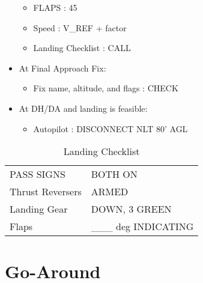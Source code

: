 \begin{itemize}
\begin{itemize}
\item FLAPS : 45

\item Speed : V\_REF + factor

\item Landing Checklist : CALL

\end{itemize}

\item At Final Approach Fix:

\begin{itemize}
\item Fix name, altitude, and flags : CHECK

\end{itemize}

\item At DH\slash DA and landing is feasible:

\begin{itemize}
\item Autopilot : DISCONNECT NLT 80' AGL

\end{itemize}

\end{itemize}

\begin{table}[htbp]
\begin{minipage}{\linewidth}
\setlength{\tymax}{0.5\linewidth}
\centering
\small
\caption{Landing Checklist}
\label{landingchecklist}
\begin{tabulary}{\textwidth}{@{}ll@{}} \toprule
\midrule

 PASS SIGNS  & BOTH ON   \\
 Thrust Reversers & ARMED    \\
 Landing Gear  & DOWN, 3 GREEN  \\
 Flaps   & \_\_\_ deg INDICATING \\
\bottomrule

\end{tabulary}
\end{minipage}
\end{table}

\section{Go-Around}
\label{go-around}


